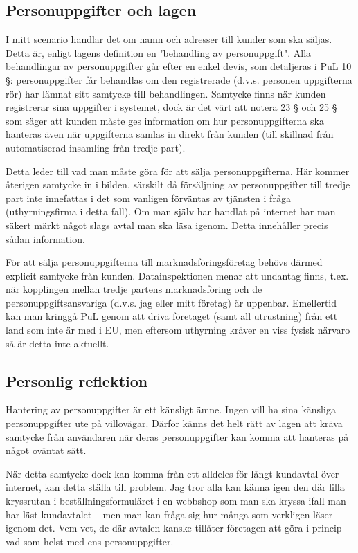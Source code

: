 \documentclass[12pt]{article}
\begin{document}
	\subsection{Personuppgifter och lagen}
	I mitt scenario handlar det om namn och adresser till kunder som ska säljas. Detta är, enligt lagens definition en "behandling av personuppgift". Alla behandlingar av personuppgifter går efter en enkel devis, som detaljeras i PuL 10 §: personuppgifter får behandlas om den registrerade (d.v.s. personen uppgifterna rör) har lämnat sitt samtycke till behandlingen. Samtycke finns när kunden registrerar sina uppgifter i systemet, dock är det värt att notera 23 § och 25 § som säger att kunden måste ges information om hur personuppgifterna ska hanteras även när uppgifterna samlas in direkt från kunden (till skillnad från automatiserad insamling från tredje part).

	Detta leder till vad man måste göra för att sälja personuppgifterna. Här kommer återigen samtycke in i bilden, särskilt då försäljning av personuppgifter till tredje part inte innefattas i det som vanligen förväntas av tjänsten i fråga (uthyrningsfirma i detta fall). Om man själv har handlat på internet har man säkert märkt något slags avtal man ska läsa igenom. Detta innehåller precis sådan information. 
	
	För att sälja personuppgifterna till marknadsföringsföretag behövs därmed explicit samtycke från kunden. Datainspektionen menar att undantag finns, t.ex. när kopplingen mellan tredje partens marknadsföring och de personuppgiftsansvariga (d.v.s. jag eller mitt företag) är uppenbar.\cite{datainspektion} Emellertid kan man kringgå PuL genom att driva företaget (samt all utrustning) från ett land som inte är med i EU, men eftersom uthyrning kräver en viss fysisk närvaro så är detta inte aktuellt.\cite{pul}
	
	\subsection{Personlig reflektion}
	Hantering av personuppgifter är ett känsligt ämne. Ingen vill ha sina känsliga personuppgifter ute på villovägar. Därför känns det helt rätt av lagen att kräva samtycke från användaren när deras personuppgifter kan komma att hanteras på något oväntat sätt.

	När detta samtycke dock kan komma från ett alldeles för långt kundavtal över internet, kan detta ställa till problem. Jag tror alla kan känna igen den där lilla kryssrutan i beställningsformuläret i en webbshop som man ska kryssa ifall man har läst kundavtalet -- men man kan fråga sig hur många som verkligen läser igenom det. Vem vet, de där avtalen kanske tillåter företagen att göra i princip vad som helst med ens personuppgifter. 
	
\end{document}
